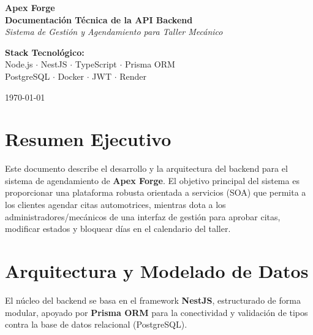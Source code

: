 \documentclass[12pt,a4paper]{article}
\begin{document}
\begin{titlepage}
    \centering
    \vspace*{2cm}
    
    {\Huge \textbf{\textcolor{secondary}{Apex Forge}}}\\[0.5cm]
    {\LARGE \textbf{Documentación Técnica de la API Backend}}\\[1.5cm]
    
    {\Large \textit{Sistema de Gestión y Agendamiento para Taller Mecánico}}\\[2cm]
    
    \begin{tcolorbox}[colback=primary!10, colframe=primary, arc=5mm, width=0.8\textwidth, center]
        \centering
        \vspace{0.5cm}
        \textbf{Stack Tecnológico:}\\
        Node.js $\cdot$ NestJS $\cdot$ TypeScript $\cdot$ Prisma ORM\\
        PostgreSQL $\cdot$ Docker $\cdot$ JWT $\cdot$ Render
        \vspace{0.5cm}
    \end{tcolorbox}
    
    \vfill
    {\large \today}\\[1cm]
\end{titlepage}

\tableofcontents
\newpage

\section{Resumen Ejecutivo}
Este documento describe el desarrollo y la arquitectura del backend para el sistema de agendamiento de \textbf{Apex Forge}. El objetivo principal del sistema es proporcionar una plataforma robusta orientada a servicios (SOA) que permita a los clientes agendar citas automotrices, mientras dota a los administradores/mecánicos de una interfaz de gestión para aprobar citas, modificar estados y bloquear días en el calendario del taller.

\section{Arquitectura y Modelado de Datos}
El núcleo del backend se basa en el framework \textbf{NestJS}, estructurado de forma modular, apoyado por \textbf{Prisma ORM} para la conectividad y validación de tipos contra la base de datos relacional (PostgreSQL).
\end{document}
